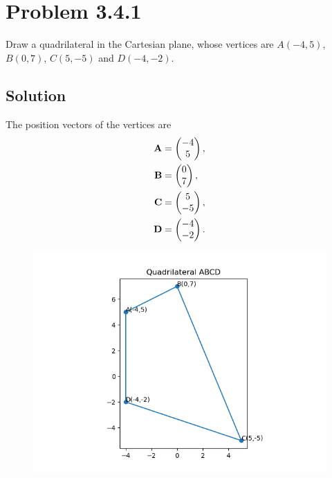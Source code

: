 \documentclass[12pt]{article}
\begin{document}
\section*{Problem 3.4.1}
Draw a quadrilateral in the Cartesian plane, whose vertices are
$A(-4,5)$, $B(0,7)$, $C(5,-5)$ and $D(-4,-2)$.

\subsection*{Solution}
The position vectors of the vertices are
\begin{align}
\mathbf{A} &= \begin{pmatrix}-4\\5\end{pmatrix}, \\
\mathbf{B} &= \begin{pmatrix}0\\7\end{pmatrix}, \\
\mathbf{C} &= \begin{pmatrix}5\\-5\end{pmatrix}, \\
\mathbf{D} &= \begin{pmatrix}-4\\-2\end{pmatrix}.
\end{align}

\begin{figure}[H]
    \centering
    \includegraphics[width=0.9\columnwidth]{figs/quad_only.png}
    \caption{}
    \label{fig:placeholder}
\end{figure}
\end{document}
